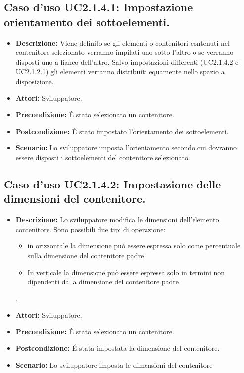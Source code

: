 \subsection{Caso d'uso UC2.1.4.1: Impostazione orientamento dei sottoelementi.}
\begin{itemize}
\item[]\textbf{Descrizione:} Viene definito se gli elementi o contenitori contenuti nel contenitore selezionato verranno impilati uno sotto l'altro o se verranno disposti uno a fianco dell'altro. Salvo impostazioni differenti (UC2.1.4.2 e UC2.1.2.1) gli elementi verranno distribuiti equamente nello spazio a disposizione.
\item[]\textbf{Attori:} Sviluppatore. 
\item[]\textbf{Precondizione:} \'E stato selezionato un contenitore. 
\item[]\textbf{Postcondizione:} \'E stato impostato l'orientamento dei sottoelementi. 
\item[]\textbf{Scenario:}
Lo sviluppatore imposta l'orientamento secondo cui dovranno essere disposti i sottoelementi del contenitore selezionato. 
\end{itemize}

\subsection{Caso d'uso UC2.1.4.2: Impostazione delle dimensioni del contenitore.}
\begin{itemize}
\item[]\textbf{Descrizione:} Lo sviluppatore modifica le dimensioni dell'elemento contenitore. Sono possibili due tipi di operazione:

\begin{itemize}

\item in orizzontale la dimensione può essere espressa solo come percentuale sulla dimensione del contenitore padre


\item In verticale la dimensione può essere espressa solo in termini non dipendenti dalla dimensione del contenitore padre


\end{itemize}.
\item[]\textbf{Attori:} Sviluppatore. 
\item[]\textbf{Precondizione:} \'E stato selezionato un contenitore. 
\item[]\textbf{Postcondizione:} \'E stata impostata la dimensione del contenitore. 
\item[]\textbf{Scenario:}
Lo sviluppatore imposta le dimensioni del contenitore 
\end{itemize}

